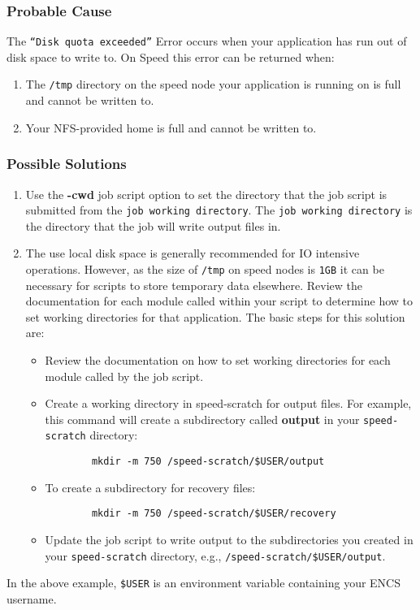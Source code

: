 \subsubsection{Probable Cause}

The \texttt{``Disk quota exceeded''} Error occurs when your application has run out of disk space to write to. On Speed this error can be returned when:
\begin{enumerate}
	\item
The \texttt{/tmp} directory on the speed node your application is running on is full and cannot be written to.
	\item
Your NFS-provided home is full and cannot be written to.
\end{enumerate}

\subsubsection{Possible Solutions}

\begin{enumerate}
	\item
Use the \textbf{-cwd} job script option to set the directory that the job 
script is submitted from the \texttt{job working directory}. The
\texttt{job working directory} is the directory that the job will write output files in.
 	\item
The use local disk space is generally recommended for IO intensive operations. However, as the size of \texttt{/tmp} on speed nodes 
is \texttt{1GB} it can be necessary for scripts to store temporary data 
elsewhere. 
Review the documentation for each module called within your script to 
determine how to set working directories for that application. 
The basic steps for this solution are:
\begin{itemize}
	\item
	Review the documentation on how to set working directories for 
	each module called by the job script.
	\item
	Create a working directory in speed-scratch for output files. 
	For example, this command will create a subdirectory called \textbf{output}
	 in your \verb!speed-scratch! directory:
	 \begin{verbatim}
		mkdir -m 750 /speed-scratch/$USER/output
	 \end{verbatim}
	\item
	To create a subdirectory for recovery files:
	\begin{verbatim}
		mkdir -m 750 /speed-scratch/$USER/recovery
	\end{verbatim}
	\item
	Update the job script to write output to the subdirectories you created in your \verb!speed-scratch! directory, e.g., \verb!/speed-scratch/$USER/output!.
	\end{itemize}
\end{enumerate}
In the above example, \verb!$USER! is an environment variable containing your ENCS username.

